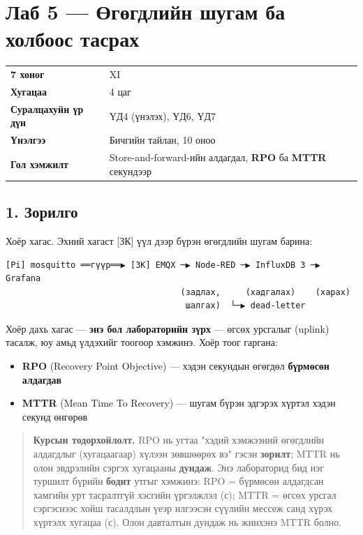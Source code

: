 \chapter{Лаб 5 — Өгөгдлийн шугам ба холбоос тасрах}

\begingroup\scriptsize\begin{longtable}[]{@{}ll@{}}
\toprule
\endhead
\textbf{7 хоног} & XI\tabularnewline
\textbf{Хугацаа} & 4 цаг\tabularnewline
\textbf{Суралцахуйн үр дүн} & ҮД4 (үнэлэх), ҮД6, ҮД7\tabularnewline
\textbf{Үнэлгээ} & Бичгийн тайлан, 10 оноо\tabularnewline
\textbf{Гол хэмжилт} & Store-and-forward-ийн алдагдал, \textbf{RPO} ба \textbf{MTTR} секундээр\tabularnewline
\bottomrule
\end{longtable}\endgroup

\hypertarget{ux437ux43eux440ux438ux43bux433ux43e}{%
\section{1. Зорилго}\label{ux437ux43eux440ux438ux43bux433ux43e}}

Хоёр хагас. Эхний хагаст {[}ЗК{]} үүл дээр бүрэн өгөгдлийн шугам барина:

\begin{verbatim}
[Pi] mosquitto ══гүүр══▶ [ЗК] EMQX ─▶ Node-RED ─▶ InfluxDB 3 ─▶ Grafana
                                   (задлах,     (хадгалах)    (харах)
                                    шалгах)  └─▶ dead-letter
\end{verbatim}

Хоёр дахь хагас --- \textbf{энэ бол лабораторийн зүрх} --- өгсөх урсгалыг (uplink) тасалж, юу амьд үлдэхийг тоогоор хэмжинэ. Хоёр тоог гаргана:

\begin{itemize}
\tightlist
\item
  \textbf{RPO} (Recovery Point Objective) --- хэдэн секундын өгөгдөл \textbf{бүрмөсөн алдагдав}
\item
  \textbf{MTTR} (Mean Time To Recovery) --- шугам бүрэн эдгэрэх хүртэл хэдэн секунд өнгөрөв
\end{itemize}

\begin{quote}
\textbf{Курсын тодорхойлолт.} RPO нь угтаа "хэдий хэмжээний өгөгдлийн алдагдлыг (хугацаагаар) хүлээн зөвшөөрөх вэ" гэсэн \textbf{зорилт}; MTTR нь олон эвдрэлийн сэргэх хугацааны \textbf{дундаж}. Энэ лабораторид бид нэг туршилт бүрийн \textbf{бодит} утгыг хэмжинэ: RPO = бүрмөсөн алдагдсан хамгийн урт тасралтгүй хэсгийн үргэлжлэл (с); MTTR = өгсөх урсгал сэргэснээс хойш тасалдлын үеэр илгээсэн сүүлийн мессеж санд хүрэх хүртэлх хугацаа (с). Олон давталтын дундаж нь жинхэнэ MTTR болно.
\end{quote}


